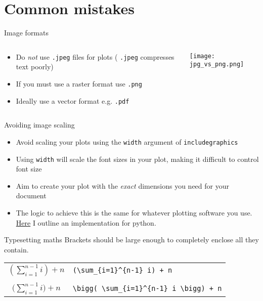 \section{Common mistakes}

\begin{frame}{Image formats}
  \begin{columns}
    \begin{column}{0.5\textwidth}
      \begin{itemize}
        \item Do \emph{not} use \texttt{.jpeg} files for plots (
          \texttt{.jpeg} compresses text poorly)
        \item If you must use a raster format use \texttt{.png}
        \item Ideally use a vector format e.g. \texttt{.pdf}
      \end{itemize}
    \end{column}
    \begin{column}{0.5\textwidth}
      \texttt{[image: jpg\_vs\_png.png]}
    \end{column}
  \end{columns}
\end{frame}

\begin{frame}{Avoiding image scaling}
  \begin{itemize}
    \item Avoid scaling your plots using the \texttt{width} argument
      of \texttt{\tb includegraphics}
    \item Using \texttt{width} will scale the font sizes in your plot, making it
	  	difficult to control font size
	  \item Aim to create your plot with the \emph{exact} dimensions you need for
      your document
    \item The logic to achieve this is the same for whatever plotting software
      you use. \href{https://jwalton.info/Embed-Publication-Matplotlib-Latex/}%
      {Here} I outline an implementation for python.
  \end{itemize}
\end{frame}

\begin{frame}[fragile]{Typesetting maths}
  Brackets should be large enough to completely enclose all they contain.
  \begin{table}
    \centering
    \begin{tabular}{cl}
      $(\sum\limits_{i=1}^{n-1} i) + n$ \hspace{1cm} &
        \lstinline|(\sum_{i=1}^{n-1} i) + n| \\ & \\
      $\bigg(\sum\limits_{i=1}^{n-1} i\bigg) + n$ \hspace{1cm} &
        \lstinline|\bigg( \sum_{i=1}^{n-1} i \bigg) + n| \\
    \end{tabular}
  \end{table}
\end{frame}

